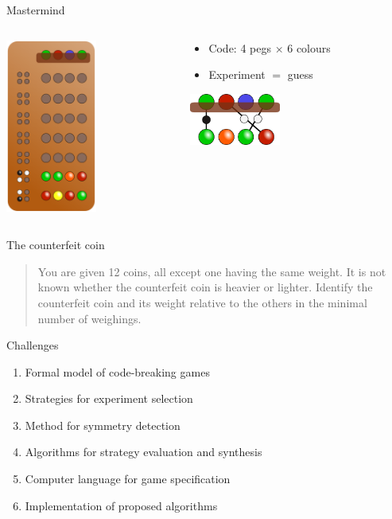 \documentclass{beamer}
\begin{document}
\begin{frame}{Mastermind}
\begin{columns}
 \begin{column}{.35\textwidth}
 \centering
 \includegraphics[width=3cm]{../pictures/mastermind.png}
 \end{column}

 \begin{column}{.6\textwidth}
  \begin{itemize}
  \item Code: 4 pegs $\times$ 6 colours
  \item Experiment $=$ guess
  \end{itemize}
  \begin{center}
  \includegraphics[width=3cm]{../pictures/mastermind-matching.png}
  \end{center}
 \end{column}
\end{columns}
\end{frame}

\begin{frame}{The counterfeit coin}
\begin{quote}
You are given 12 coins, all except one having the same weight.
It is not known whether the counterfeit coin is heavier or lighter.
Identify the counterfeit coin and its weight relative to the others
  in the minimal number of weighings.
\end{quote}
\end{frame}

\begin{frame}{Challenges}
\begin{enumerate}
\item Formal model of code-breaking games
\item Strategies for experiment selection
\item Method for symmetry detection
\item Algorithms for strategy evaluation and synthesis
\item Computer language for game specification
\item Implementation of proposed algorithms
\end{enumerate}
\end{frame}
\end{document}
